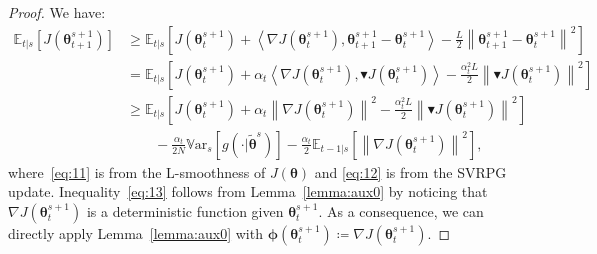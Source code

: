 \documentclass{article}
\theoremstyle{remark}
\theoremstyle{definition}
\newcommand{\norm}[2][\infty]{\left\|#2\right\|_{#1}}
\newcommand{\dotprod}[2]{\left\langle#1,#2\right\rangle}
\newcommand{\vtheta}{\boldsymbol{\theta}}
\newcommand{\vphi}{\boldsymbol{\phi}}
\newcommand{\gradJ}[1]{\nabla J(#1)}
\newcommand{\Ets}[2][t]{\mathbb{E}_{#1\vert s}\left[#2\right]}
\newcommand{\Vars}[1]{{\mathbb{V}\text{ar}}_{s}\left[#1\right]}
\newcommand{\gradBlack}[1]{\blacktriangledown J(#1)}
\newcommand{\wt}[1]{\widetilde{#1}}
\begin{document}
\begin{proof}
	We have:
	\begin{align}
	\Ets{J(\vtheta_{t+1}^{s+1})} 
	&\geq \Ets{J(\vtheta_t^{s+1})+\dotprod{\gradJ{\vtheta_t^{s+1}}}{\vtheta_{t+1}^{s+1}-\vtheta_t^{s+1}} - \frac{L}{2}\norm[]{\vtheta_{t+1}^{s+1}-\vtheta_t^{s+1}}^2} \label{eq:11}\\
	&= \Ets{J(\vtheta_t^{s+1})+\alpha_t\dotprod{\gradJ{\vtheta_t^{s+1}}}{\gradBlack{\vtheta_t^{s+1}}} - \frac{\alpha_t^2L}{2}\norm[]{\gradBlack{\vtheta_t^{s+1}}}^2} \label{eq:12}\\
	&\geq
	\Ets{J(\vtheta_t^{s+1})+\alpha_t\norm[]{\gradJ{\vtheta_t^{s+1}}}^2 - \frac{\alpha_t^2L}{2}\norm[]{\gradBlack{\vtheta_t^{s+1}}}^2} \nonumber\\
	&\qquad-
	\frac{\alpha_t}{2N}\Vars{g(\cdot\vert\wt{\vtheta}^s)} -\frac{\alpha_t}{2}\Ets[t-1]{\norm[]{\gradJ{\vtheta_t^{s+1}}}^2}, \label{eq:13}
\end{align}
where~\eqref{eq:11} is from the L-smoothness of $J(\vtheta)$ \cite{nesterov2013introductory} and \eqref{eq:12} is from the SVRPG update.
Inequality~\ref{eq:13} follows from Lemma~\ref{lemma:aux0} by noticing that $\nabla J(\vtheta^{s+1}_t)$ is a deterministic function given $\vtheta^{s+1}_t$. As a consequence, we can directly apply Lemma~\ref{lemma:aux0} with $\vphi(\vtheta_t^{s+1})\coloneqq\gradJ{\vtheta_t^{s+1}}$.


\end{proof}
\end{document}
